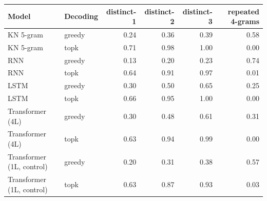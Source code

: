 \begin{tabular}{@{}llrrrr@{}}
\toprule
Model & Decoding & distinct-1 & distinct-2 & distinct-3 & repeated 4-grams \\
\midrule
KN 5-gram & greedy & 0.24 & 0.36 & 0.39 & 0.58 \\
KN 5-gram & topk & 0.71 & 0.98 & 1.00 & 0.00 \\
RNN & greedy & 0.13 & 0.20 & 0.23 & 0.74 \\
RNN & topk & 0.64 & 0.91 & 0.97 & 0.01 \\
LSTM & greedy & 0.30 & 0.50 & 0.65 & 0.25 \\
LSTM & topk & 0.66 & 0.95 & 1.00 & 0.00 \\
Transformer (4L) & greedy & 0.30 & 0.48 & 0.61 & 0.31 \\
Transformer (4L) & topk & 0.63 & 0.94 & 0.99 & 0.00 \\
Transformer (1L, control) & greedy & 0.20 & 0.31 & 0.38 & 0.57 \\
Transformer (1L, control) & topk & 0.63 & 0.87 & 0.93 & 0.03 \\
\bottomrule
\end{tabular}